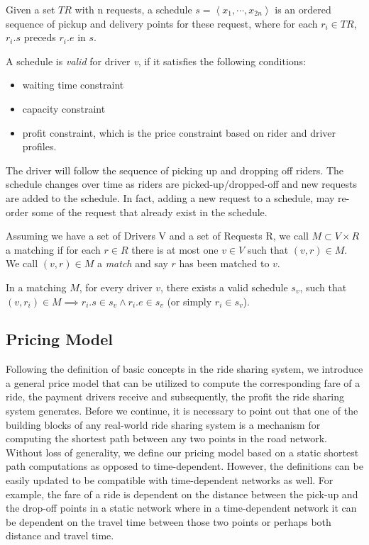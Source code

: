 \begin{definition} [Schedule]
Given a set $TR$ with n requests, a schedule $s= \left\langle x_1, \cdots, x_{2n} \right\rangle$ is an ordered sequence of pickup and delivery points for these request, where for each $r_i \in TR$, $r_i.s$ preceds $r_i.e$ in $s$. 
\end{definition}

A schedule is \textit{valid} for driver \textit{v}, if it satisfies the following conditions:

\begin{itemize}
\item waiting time constraint
\item capacity constraint
\item profit constraint, which is the price constraint based on rider and driver profiles. 
\end{itemize}

The driver will follow the sequence of picking up and dropping off riders. The schedule changes over time as riders are picked-up/dropped-off and new requests are added to the schedule. In fact, adding a new request to a schedule, may re-order some of the request that already exist in the schedule.

\begin{definition} [Matching]
Assuming we have a set of Drivers V and a set of Requests R, we call $M \subset V \times R$ a matching if for each $r \in R$ there is at most one $v \in V$ such that $\left( v, r \right) \in M$. We call $\left( v, r \right) \in M$ a \emph{match} and say $r$ has been matched to $v$.
\end{definition}

\noindent In a matching $M$, for every driver $v$, there exists a valid schedule $s_v$, such that $(v, r_i) \in M \implies r_i.s \in s_v \wedge r_i.e \in s_v$ (or simply $r_i \in s_v$). 

\subsection{Pricing Model}
\label{subsec:pricing}

Following the definition of basic concepts in the ride sharing system, we introduce a general price model that can be utilized to compute the corresponding fare of a ride, the payment drivers receive and subsequently, the profit the ride sharing system generates. Before we continue, it is necessary to point out that one of the building blocks of any real-world ride sharing system is a mechanism for computing the shortest path between any two points in the road network. Without loss of generality, we define our pricing model based on a static shortest path computations as opposed to time-dependent. However, the definitions can be easily updated to be compatible with time-dependent networks as well. For example, the fare of a ride is dependent on the distance between the pick-up and the drop-off points in a static network where in a time-dependent network it can be dependent on the travel time between those two points or perhaps both distance and travel time.

